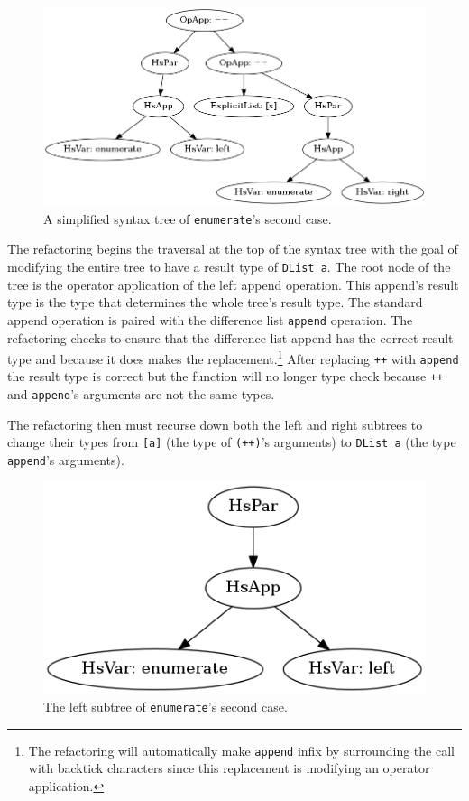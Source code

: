 \begin{figure}[h]\label{enumAST}
	\begin{center}
		\includegraphics[scale=.5]{graphVis/Chapter3/enumerate.png}
	\end{center}
	\caption{A simplified syntax tree of \texttt{enumerate}'s second case.}
\end{figure}

The refactoring begins the traversal at the top of the syntax tree with the goal of modifying the entire tree to have a result type of \texttt{DList a}. The root node of the tree is the operator application of the left append operation. This append's result type is the type that determines the whole tree's result type. The standard append operation is paired with the difference list \texttt{append} operation. The refactoring checks to ensure that the difference list append has the correct result type and because it does makes the replacement.\footnote{The refactoring will automatically make \texttt{append} infix by surrounding the call with backtick characters since this replacement is modifying an operator application.} After replacing \texttt{++} with \texttt{append} the result type is correct but the function will no longer type check because \texttt{++} and \texttt{append}'s arguments are not the same types. 

The refactoring then must recurse down both the left and right subtrees to change their types from \texttt{[a]} (the type of \texttt{(++)}'s arguments) to \texttt{DList a} (the type \texttt{append}'s arguments). 

\begin{figure}[h]\label{enumLeft}
	\begin{center}
		\includegraphics[scale=.5]{graphVis/Chapter3/enumLeft.png}
	\end{center}
	\caption{The left subtree of \texttt{enumerate}'s second case.}
\end{figure}

